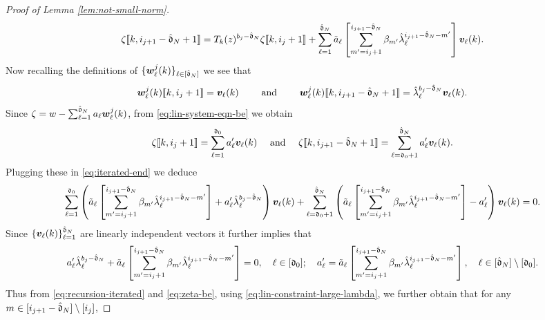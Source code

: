 \documentclass{amsart}
\numberwithin{equation}{section}
\def\corAB{}
\begin{document}
\begin{proof}[Proof of Lemma \ref{lem:not-small-norm}]
\begin{equation}\label{eq:iterated-end}
\zeta\dvec{k, i_{j+1}-\hat\gd_N+1}= T_k(z)^{b_j-\hat\gd_N} \zeta\dvec{k,i_j+1} + \sum_{\ell=1}^{\corAB{\hat\gd_N}} \tilde{a}_\ell \left[\sum_{m'=i_j+1}^{i_{j+1}-\hat\gd_N} \beta_{m'} \hat{\lambda}_\ell^{i_{j+1}-\hat\gd_N-m'} \right] {\bm v}_\ell(k).
\end{equation}
Now recalling the definitions of $\{\corAB{{\bm w}_\ell^j(k)}\}_{\ell \in [\corAB{\hat\gd_N}]}$ we see that
\[
{\bm w}_\ell^j(k)\llbracket k,i_j+1 \rrbracket = {\bm v}_\ell(k) \qquad \text{ and } \qquad {\bm w}_\ell^j(k)\llbracket k, i_{j+1}-\hat{\mathfrak{d}}_N+1 \rrbracket = \hat{\lambda}_\ell^{b_j-\hat{\mathfrak{d}}_N} {\bm v}_\ell(k).
\]
Since $\zeta= w - \sum_{\ell=1}^{\hat{\mathfrak{d}}_N} a_\ell {\bm w}_\ell^j(k)$, from \eqref{eq:lin-system-eqn-be} we obtain
\begin{equation}\label{eq:zeta-be}
\zeta \llbracket k, i_j+1 \rrbracket= \sum_{\ell=1}^{\mathfrak{d}_0} a_\ell' {\bm v}_\ell(k) \quad \text{ and } \quad \zeta \llbracket k, i_{j+1}-\hat{\mathfrak{d}}_N+1 \rrbracket= \sum_{\ell=\mathfrak{d}_0+1}^{\hat{\mathfrak{d}}_N} a_\ell' {\bm v}_\ell(k).
\end{equation}
Plugging these in \eqref{eq:iterated-end} we deduce
\[
\sum_{\ell=1}^{\mathfrak{d}_0} \left( \tilde{a}_\ell \left[\sum_{m'=i_j+1}^{i_{j+1}-\hat{\mathfrak{d}}_N} \beta_{m'} \hat{\lambda}_\ell^{i_{j+1}-\hat{\mathfrak{d}}_N-m'} \right]+ a_\ell' \hat{\lambda}_\ell^{b_j-\hat{\mathfrak{d}}_N} \right){\bm v}_\ell(k) + \sum_{\ell=\mathfrak{d}_0+1}^{\hat{\mathfrak{d}}_N} \left( \tilde{a}_\ell \left[\sum_{m'=i_j+1}^{i_{j+1}-\hat{\mathfrak{d}}_N} \beta_{m'} \hat{\lambda}_\ell^{i_{j+1}-\hat{\mathfrak{d}}_N-m'} \right] - a_\ell'\right){\bm v}_\ell(k) =0.
\]
Since $\{{\bm v}_\ell(k)\}_{\ell=1}^{\hat{\mathfrak{d}}_N}$ are linearly independent vectors it further implies that
\begin{equation}\label{eq:lin-constraint-large-lambda}
a_\ell' \hat{\lambda}_\ell^{b_j-\hat{\mathfrak{d}}_N} +\tilde{a}_\ell \left[\sum_{m'=i_j+1}^{i_{j+1}-\hat{\mathfrak{d}}_N} \beta_{m'} \hat{\lambda}_\ell^{i_{j+1}-\hat{\mathfrak{d}}_N-m'} \right]=0, \quad \ell \in [\mathfrak{d}_0]; \quad  a_\ell' = \tilde{a}_\ell \left[\sum_{m'=i_j+1}^{i_{j+1}-\hat{\mathfrak{d}}_N} \beta_{m'} \hat{\lambda}_\ell^{i_{j+1}-\hat{\mathfrak{d}}_N-m'} \right], \quad \ell \in [\hat{\mathfrak{d}}_N]\setminus[\mathfrak{d}_0].
\end{equation}
Thus from \eqref{eq:recursion-iterated} and \eqref{eq:zeta-be}, using \eqref{eq:lin-constraint-large-lambda}, we further obtain that for any $m \in [i_{j+1}-\hat{\mathfrak{d}}_N]\setminus[i_j]$,

\end{proof}
\end{document}
